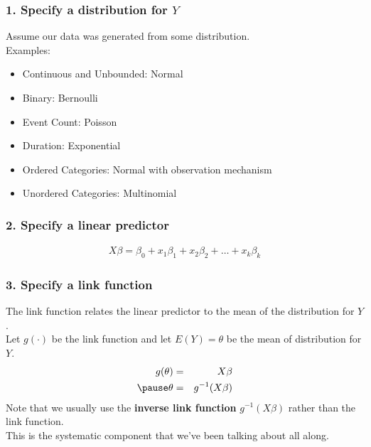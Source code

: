 \documentclass[handout]{beamer}
\begin{document}
\begin{frame}
\frametitle{1. Specify a distribution for $Y$}
\pause
Assume our data was generated from some distribution.\\
\pause
\bigskip
Examples:
\pause
\begin{itemize}
\item Continuous and Unbounded: \pause Normal
\pause
\item Binary: \pause Bernoulli 
\pause
\item Event Count: \pause Poisson
\pause
\item Duration: \pause Exponential
\pause
\item Ordered Categories: \pause Normal with observation mechanism
\pause
\item Unordered Categories: \pause Multinomial
\end{itemize}
\end{frame}

\begin{frame}
\frametitle{2. Specify a linear predictor}
\pause
\begin{eqnarray*}
X \beta = \beta_0 + x_1 \beta_1 + x_2 \beta_2 + \dots + x_k \beta_k
\end{eqnarray*}
\end{frame}

\begin{frame}
\frametitle{3. Specify a link function}
\pause
The link function relates the linear predictor to the mean of the
distribution for $Y$. \\
\bigskip
\pause
Let $g(\cdot)$ be the link function and let $E(Y) = \theta$ be the
mean of distribution for $Y$.  
\pause
\begin{eqnarray*}
g(\theta) &=& X\beta \\
\pause
\theta &=& g^{-1} (X \beta)
\end{eqnarray*}
\pause
Note that we usually use the \textbf{inverse link function} $g^{-1}(X
\beta)$ rather than the link function. \\
\pause
\bigskip
This is the systematic component that we've been talking about all along.
\end{frame}
\end{document}
